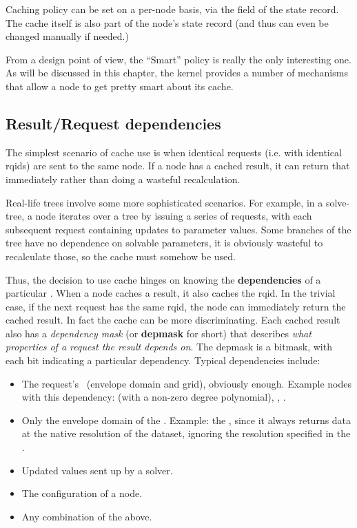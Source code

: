   Caching policy can be set on a per-node basis, via the 
  field of the state record. The cache itself is also part of the node's state
  record (and thus can even be changed manually if needed.)

  From a design point of view, the ``Smart'' policy is really the only
  interesting one. As will be discussed in this chapter, the kernel provides a
  number of mechanisms that allow a node to get pretty smart about its cache.

\subsection{Result/Request dependencies}
\label{sec:depmask-result}
\label{sec:rqid-contract}

  The simplest scenario of cache use is when identical requests (i.e. with
  identical rqids) are sent to the same node. If a node has a cached result, it
  can return that immediately rather than doing a wasteful recalculation.

  Real-life trees involve some more sophisticated scenarios. For example, in a
  solve-tree, a  node iterates over a tree by issuing a series of
  requests, with each subsequent request containing updates to parameter
  values. Some branches of the tree have no dependence on solvable parameters,
  it is obviously wasteful to recalculate those, so the cache must somehow be
  used.

  Thus, the decision to use cache hinges on knowing the {\bf dependencies} of a
  particular . When a node caches a result, it also caches the rqid.
  In the trivial case, if the next request has the same rqid, the node can
  immediately return the cached result. In fact the cache can be more
  discriminating. Each cached result also has a {\em dependency mask} (or {\bf
  depmask} for short) that describes {\em what properties of a request the
  result depends on}. The depmask is a bitmask, with each bit indicating a
  particular dependency. Typical dependencies include:

  \begin{itemize} 
  
  \item The request's \Cells\ (envelope domain and grid), obviously enough.
  Example nodes with this dependency:  (with a non-zero degree
  polynomial), , . 

  \item Only the envelope domain of the \Cells. Example: the , since
  it always returns data at the native resolution of the dataset, ignoring the
  resolution specified in the \Cells.

  \item Updated  values sent up by a solver.
  
  \item The configuration of a  node.

  \item Any combination of the above. 

  \end{itemize}
  

